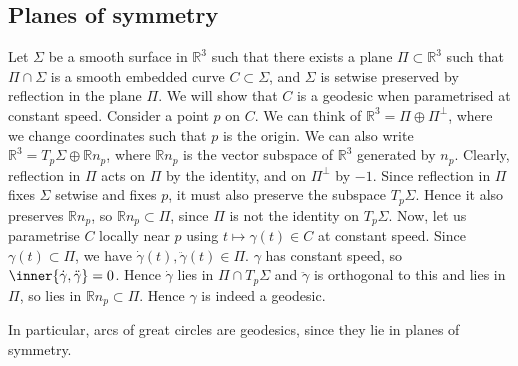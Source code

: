 \subsection{Planes of symmetry}
Let $\Sigma$ be a smooth surface in $\mathbb R^3$ such that there exists a plane $\Pi \subset \mathbb R^3$ such that $\Pi \cap \Sigma$ is a smooth embedded curve $C \subset \Sigma$, and $\Sigma$ is setwise preserved by reflection in the plane $\Pi$.
We will show that $C$ is a geodesic when parametrised at constant speed.
Consider a point $p$ on $C$.
We can think of $\mathbb R^3 = \Pi \oplus \Pi^\perp$, where we change coordinates such that $p$ is the origin.
We can also write $\mathbb R^3 = T_p \Sigma \oplus \mathbb R n_p$, where $\mathbb R n_p$ is the vector subspace of $\mathbb R^3$ generated by $n_p$.
Clearly, reflection in $\Pi$ acts on $\Pi$ by the identity, and on $\Pi^\perp$ by $-1$.
Since reflection in $\Pi$ fixes $\Sigma$ setwise and fixes $p$, it must also preserve the subspace $T_p \Sigma$.
Hence it also preserves $\mathbb R n_p$, so $\mathbb R n_p \subset \Pi$, since $\Pi$ is not the identity on $T_p \Sigma$.
Now, let us parametrise $C$ locally near $p$ using $t \mapsto \gamma(t) \in C$ at constant speed.
Since $\gamma(t) \subset \Pi$, we have $\dot \gamma(t), \ddot \gamma(t) \in \Pi$.
$\gamma$ has constant speed, so $\inner{\dot \gamma, \ddot \gamma} = 0$.
Hence $\dot \gamma$ lies in $\Pi \cap T_p \Sigma$ and $\ddot \gamma$ is orthogonal to this and lies in $\Pi$, so lies in $\mathbb R n_p \subset \Pi$.
Hence $\gamma$ is indeed a geodesic.

In particular, arcs of great circles are geodesics, since they lie in planes of symmetry.

